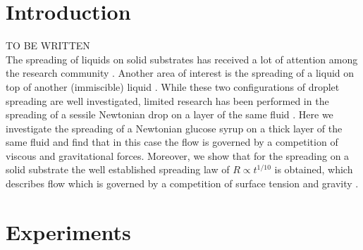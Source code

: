 \documentclass[aip,graphicx]{revtex4-1}
\begin{document}
\pacs{}%

\maketitle %



\section{Introduction}
\label{sec:introduction}

\noindent TO BE WRITTEN\\ The spreading of liquids on solid substrates
has received a lot of attention among the research community
\cite{de1985wetting, bonn2009wetting}.  Another area of interest is
the spreading of a liquid on top of another (immiscible) liquid
\cite{fraaije1989dynamics, joos1977spreading}.  While these two
configurations of droplet spreading are well investigated, limited
research has been performed in the spreading of a sessile Newtonian
drop on a layer of the same fluid \cite{tanner1979spreading,
  cormier2012beyond, chebbi1999capillary}.  Here we investigate the
spreading of a Newtonian glucose syrup on a thick layer of the same
fluid and find that in this case the flow is governed by a competition
of viscous and gravitational forces.  Moreover, we show that for the
spreading on a solid substrate the well established spreading law of
$R \propto t^{1/10}$ is obtained, which describes flow which is
governed by a competition of surface tension and gravity
\cite{bonn2009wetting}.

\section{Experiments}
\label{sec:experiments}
\end{document}
